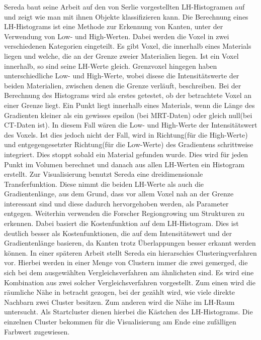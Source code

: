 Sereda baut seine Arbeit \cite{sereda2006visualization} auf den von Serlie \cite{serlie2003computed} vorgestellten LH-Histogramen auf und zeigt wie man mit ihnen Objekte klassifizieren kann. Die Berechnung eines LH-Histograms ist eine Methode zur Erkennung von Kanten, unter der Verwendung von Low- und High-Werten. Dabei werden die Voxel in zwei verschiedenen Kategorien eingeteilt. Es gibt Voxel, die  innerhalb eines Materials liegen und welche, die  an der Grenze zweier Materialien liegen. Ist ein Voxel innerhalb, so sind seine LH-Werte gleich. Grenzvoxel hingegen haben unterschiedliche Low- und High-Werte, wobei disese die Intensitätswerte der beiden Materialien, zwischen denen die Grenze verläuft, beschreiben. 
\newline
Bei der Berechnung des Histograms wird als erstes getestet, ob der betrachtete Voxel an einer Grenze liegt. Ein Punkt liegt innerhalb eines Materials, wenn  die Länge des Gradienten kleiner als ein gewisses epsilon (bei MRT-Daten) oder gleich null(bei CT-Daten ist). In diesem Fall wären die Low- und High-Werte der Intensitätswert des Voxels. Ist dies jedoch nicht der Fall, wird in Richtung(für die High-Werte) und entgegengesetzter Richtung(für die Low-Werte) des Gradientens schrittweise integriert. Dies stoppt sobald ein Material gefunden wurde. Dies wird für jeden Punkt im Volumen berechnet und danach aus allen LH-Werten ein Histogram erstellt.
\newline 
Zur Visualisierung benutzt Sereda eine dreidimensionale Transferfunktion. Diese nimmt die beiden LH-Werte als auch die Gradientenlänge, aus dem Grund, dass vor allem Voxel nah an der Grenze interessant sind und diese dadurch hervorgehoben werden, als Parameter entgegen.
\newline
Weiterhin verwenden die Forscher Regiongrowing um Strukturen zu erkennen. Dabei basiert die Kostenfunktion auf dem LH-Histogram. Dies ist deutlich besser als Kostenfunktionen, die auf dem Intensitätswert und der Gradientenlänge basieren, da Kanten trotz Überlappungen besser erkannt werden können.
\newline
\newline
In einer späteren Arbeit \cite{sereda2006automating} stellt Sereda ein hierarschies Clusteringverfahren vor. Hierbei werden in einer Menge von Clustern immer die zwei gemerged, die sich bei dem ausgewählten Vergleichsverfahren am ähnlichsten sind. Es wird eine Kombination aus zwei solcher Vergleichsverfahren vorgestellt. Zum einen wird die räumliche Nähe in betracht gezogen, bei der gezählt wird, wie viele direkte Nachbarn zwei Cluster besitzen. Zum anderen wird die Nähe im LH-Raum untersucht. Als Startcluster dienen hierbei die Kästchen des LH-Histograms. Die einzelnen Cluster bekommen für die Visualisierung am Ende eine zufälligen Farbwert zugewiesen. 



